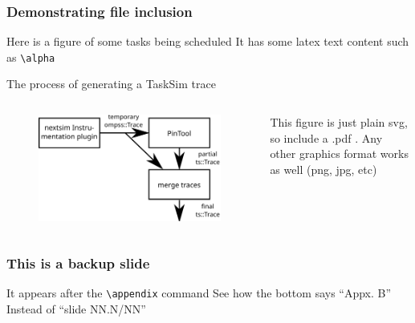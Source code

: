 \documentclass[c,12pt]{beamer}
\begin{document}
\begin{frame}[fragile]
	\frametitle{Demonstrating file inclusion}
	\begin{block}{Here is a figure of some tasks being scheduled}
		It has some latex text content such as \verb|\alpha|
		\begin{figure}[h!]
		\centering
		\tiny %
		
		\end{figure}
	\end{block}
	\vspace{-1em}\pause
	\begin{block}{The process of generating a TaskSim trace}
		\begin{columns}
		\begin{column}{0.3\linewidth}
			\begin{figure}[h!]
			\centering
			\includegraphics[width=\linewidth]{tracing_architecture}
			\end{figure}
		\end{column}
		\begin{column}{0.5\linewidth}
			This figure is just plain svg, so include a .pdf . Any other graphics format works as well (png, jpg, etc)
		\end{column}
		\end{columns}
	\end{block}
\end{frame}


\appendix

\begin{frame}
	\frametitle{This is a backup slide}
	\begin{block}{It appears after the \texttt{\textbackslash appendix} command}
		See how the bottom says ``Appx. B'' Instead of ``slide NN.N/NN''
	\end{block}
\end{frame}
\end{document}
